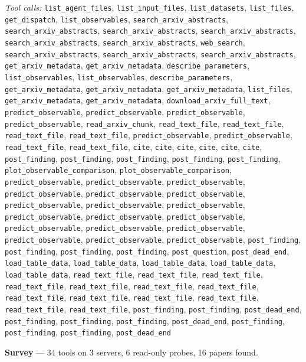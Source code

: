 \documentclass[11pt,a4paper]{article}
\begin{document}
\textit{Tool calls:} \texttt{list\_agent\_files}, \texttt{list\_input\_files}, \texttt{list\_datasets}, \texttt{list\_files}, \texttt{get\_dispatch}, \texttt{list\_observables}, \texttt{search\_arxiv\_abstracts}, \texttt{search\_arxiv\_abstracts}, \texttt{search\_arxiv\_abstracts}, \texttt{search\_arxiv\_abstracts}, \texttt{search\_arxiv\_abstracts}, \texttt{search\_arxiv\_abstracts}, \texttt{web\_search}, \texttt{search\_arxiv\_abstracts}, \texttt{search\_arxiv\_abstracts}, \texttt{search\_arxiv\_abstracts}, \texttt{get\_arxiv\_metadata}, \texttt{get\_arxiv\_metadata}, \texttt{describe\_parameters}, \texttt{list\_observables}, \texttt{list\_observables}, \texttt{describe\_parameters}, \texttt{get\_arxiv\_metadata}, \texttt{get\_arxiv\_metadata}, \texttt{get\_arxiv\_metadata}, \texttt{list\_files}, \texttt{get\_arxiv\_metadata}, \texttt{get\_arxiv\_metadata}, \texttt{download\_arxiv\_full\_text}, \texttt{predict\_observable}, \texttt{predict\_observable}, \texttt{predict\_observable}, \texttt{predict\_observable}, \texttt{read\_arxiv\_chunk}, \texttt{read\_text\_file}, \texttt{read\_text\_file}, \texttt{read\_text\_file}, \texttt{read\_text\_file}, \texttt{predict\_observable}, \texttt{predict\_observable}, \texttt{read\_text\_file}, \texttt{read\_text\_file}, \texttt{cite}, \texttt{cite}, \texttt{cite}, \texttt{cite}, \texttt{cite}, \texttt{cite}, \texttt{post\_finding}, \texttt{post\_finding}, \texttt{post\_finding}, \texttt{post\_finding}, \texttt{post\_finding}, \texttt{plot\_observable\_comparison}, \texttt{plot\_observable\_comparison}, \texttt{predict\_observable}, \texttt{predict\_observable}, \texttt{predict\_observable}, \texttt{predict\_observable}, \texttt{predict\_observable}, \texttt{predict\_observable}, \texttt{predict\_observable}, \texttt{predict\_observable}, \texttt{predict\_observable}, \texttt{predict\_observable}, \texttt{predict\_observable}, \texttt{predict\_observable}, \texttt{predict\_observable}, \texttt{predict\_observable}, \texttt{predict\_observable}, \texttt{predict\_observable}, \texttt{predict\_observable}, \texttt{predict\_observable}, \texttt{post\_finding}, \texttt{post\_finding}, \texttt{post\_finding}, \texttt{post\_finding}, \texttt{post\_question}, \texttt{post\_dead\_end}, \texttt{load\_table\_data}, \texttt{load\_table\_data}, \texttt{load\_table\_data}, \texttt{load\_table\_data}, \texttt{load\_table\_data}, \texttt{read\_text\_file}, \texttt{read\_text\_file}, \texttt{read\_text\_file}, \texttt{read\_text\_file}, \texttt{read\_text\_file}, \texttt{read\_text\_file}, \texttt{read\_text\_file}, \texttt{read\_text\_file}, \texttt{read\_text\_file}, \texttt{read\_text\_file}, \texttt{read\_text\_file}, \texttt{read\_text\_file}, \texttt{read\_text\_file}, \texttt{post\_finding}, \texttt{post\_finding}, \texttt{post\_dead\_end}, \texttt{post\_finding}, \texttt{post\_finding}, \texttt{post\_finding}, \texttt{post\_dead\_end}, \texttt{post\_finding}, \texttt{post\_finding}, \texttt{post\_finding}, \texttt{post\_dead\_end}\par
\textbf{Survey} --- 34 tools on 3 servers, 6 read-only probes, 16 papers found.
\end{document}
